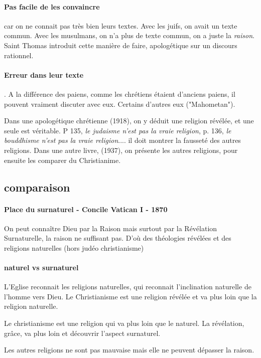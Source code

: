 \paragraph{Pas facile de les convaincre} car on ne connait pas très bien leurs textes. Avec les juifs, on avait un texte commun. Avec les musulmans, on n'a plus de texte commun, on a juste la \emph{raison}. Saint Thomas introduit cette manière de faire, apologétique sur un discours rationnel.
\paragraph{Erreur dans leur texte}. A la différence des paiens, comme les chrétiens étaient d'anciens paiens, il pouvent vraiment discuter avec eux. 
Certains d'autres eux ("Mahometan"). 

Dans une apologétique chrétienne (1918), on y déduit une religion révélée, et une seule est véritable. P 135, \textit{le judaisme n'est pas la vraie religion}, p. 136, \textit{le bouddhisme n'est pas la vraie religion}.... il doit montrer la fausseté des autres religions.
Dans une autre livre, (1937), on présente les autres religions, pour ensuite les comparer du Christianime. 





\subsection{comparaison}

\paragraph{Place du surnaturel - Concile Vatican I - 1870} On peut connaître Dieu par la Raison mais surtout par la Révélation Surnaturelle, la raison ne suffisant pas. D'où des théologies révélées et des religions naturelles (hors judéo christianisme)

\paragraph{naturel vs surnaturel} L'Eglise reconnait les religions naturelles, qui reconnait l'inclination naturelle de l'homme vers Dieu. Le Christianisme est une religion révélée et va plus loin que la religion naturelle.
\begin{Def}[Surnaturel]
Le christianisme est une religion qui va plus loin que le naturel.
La révélation, grâce, va plus loin et découvrir l'aspect surnaturel. 
\end{Def}
Les autres religions ne sont pas mauvaise mais elle ne peuvent dépasser la raison. 


